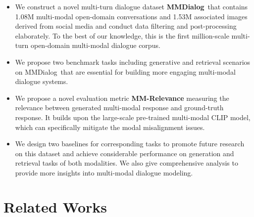 \documentclass[11pt]{article}
\newcommand{\DataName}{MMDialog}
\begin{document}
\begin{itemize}
\setlength{\itemsep}{0pt}
    \item We construct a novel multi-turn dialogue dataset \textbf{\DataName}~that contains 1.08M multi-modal open-domain conversations and 1.53M associated images derived from social media and conduct data filtering and post-processing elaborately. To the best of our knowledge, this is the first million-scale multi-turn open-domain multi-modal dialogue corpus.
    \item We propose two benchmark tasks including generative and retrieval scenarios on \DataName~that are essential for building more engaging multi-modal dialogue systems.
    \item We propose a novel evaluation metric \textbf{MM-Relevance} measuring the relevance between generated multi-modal response and ground-truth response. It builds upon the large-scale pre-trained multi-modal CLIP model, which can specifically mitigate the modal misalignment issues.
    \item We design two baselines for corresponding tasks to promote future research on this dataset and achieve considerable performance on generation and retrieval tasks of both modalities. We also give comprehensive analysis to provide more insights into multi-modal dialogue modeling.
\end{itemize}













































%
 \section{Related Works}
\end{document}
